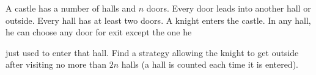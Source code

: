 A castle has a number of halls and $n$ doors. Every door leads into another hall or outside. Every hall has at least two doors. A knight enters the castle. In any hall, he can choose any door for exit except the one he

just used to enter that hall. Find a strategy allowing the knight to get outside after visiting no more than $2n$ halls (a hall is counted each time it is entered).